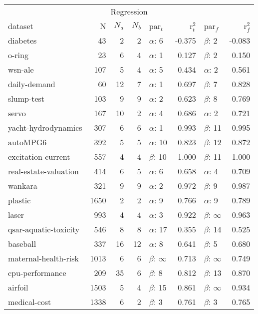 \begin{tabular}{l@{\hspace{6pt}}r@{\hspace{6pt}}r@{\hspace{6pt}}r@{\hspace{6pt}}l@{\hspace{6pt}}r@{\hspace{6pt}}l@{\hspace{6pt}}r}
\toprule
\multicolumn{8}{c}{Regression} \\
dataset & N & $N_a$ & $N_b$ & par$_t$ & r$^2_t$ & par$_f$ & r$^2_f$ \\
\midrule
diabetes \citep{keel} & 43 & 2 & 2 & $\alpha$: 6 & -0.375 & $\beta$: 2 & -0.083 \\
o-ring \citep{uci} & 23 & 6 & 4 & $\alpha$: 1 & 0.127 & $\beta$: 2 & 0.150 \\
wsn-ale \citep{uci} & 107 & 5 & 4 & $\alpha$: 5 & 0.434 & $\alpha$: 2 & 0.561 \\
daily-demand \citep{uci} & 60 & 12 & 7 & $\alpha$: 1 & 0.697 & $\beta$: 7 & 0.828 \\
slump-test \citep{krnn} & 103 & 9 & 9 & $\alpha$: 2 & 0.623 & $\beta$: 8 & 0.769 \\
servo \citep{uci} & 167 & 10 & 2 & $\alpha$: 4 & 0.686 & $\alpha$: 2 & 0.721 \\
yacht-hydrodynamics \citep{krnn} & 307 & 6 & 6 & $\alpha$: 1 & 0.993 & $\beta$: 11 & 0.995 \\
autoMPG6 \citep{keel} & 392 & 5 & 5 & $\alpha$: 10 & 0.823 & $\beta$: 12 & 0.872 \\
excitation-current \citep{uci} & 557 & 4 & 4 & $\beta$: 10 & 1.000 & $\beta$: 11 & 1.000 \\
real-estate-valuation \citep{uci} & 414 & 6 & 5 & $\alpha$: 6 & 0.658 & $\alpha$: 4 & 0.709 \\
wankara \citep{keel} & 321 & 9 & 9 & $\alpha$: 2 & 0.972 & $\beta$: 9 & 0.987 \\
plastic \citep{keel} & 1650 & 2 & 2 & $\alpha$: 9 & 0.766 & $\alpha$: 9 & 0.789 \\
laser \citep{keel} & 993 & 4 & 4 & $\alpha$: 3 & 0.922 & $\beta$: $\infty$ & 0.963 \\
qsar-aquatic-toxicity \citep{uci} & 546 & 8 & 8 & $\alpha$: 17 & 0.355 & $\beta$: 14 & 0.525 \\
baseball \citep{keel} & 337 & 16 & 12 & $\alpha$: 8 & 0.641 & $\beta$: 5 & 0.680 \\
maternal-health-risk \citep{uci} & 1013 & 6 & 6 & $\beta$: $\infty$ & 0.713 & $\beta$: $\infty$ & 0.749 \\
cpu-performance \citep{krnn} & 209 & 35 & 6 & $\beta$: 8 & 0.812 & $\beta$: 13 & 0.870 \\
airfoil \citep{krnn} & 1503 & 5 & 4 & $\beta$: 15 & 0.861 & $\beta$: $\infty$ & 0.934 \\
medical-cost \citep{mlwithr} & 1338 & 6 & 2 & $\beta$: 3 & 0.761 & $\beta$: 3 & 0.765 \\
\bottomrule
\end{tabular}
